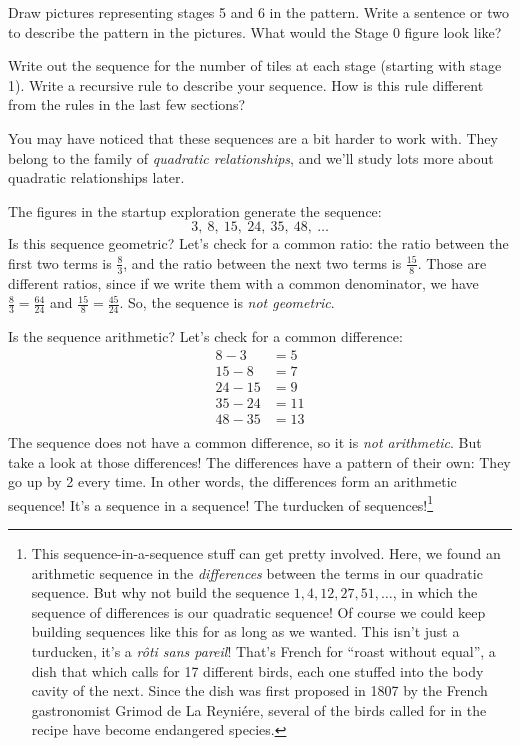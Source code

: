 \begin{boxedexplore}
Draw pictures representing stages 5 and 6 in the pattern. Write a sentence or two to describe the pattern in the pictures. What would the Stage 0 figure look like?

Write out the sequence for the number of tiles at each stage (starting with stage 1). Write a recursive rule to describe your sequence. How is this rule different from the rules in the last few sections?
\end{boxedexplore} %

You may have noticed that these sequences are a bit harder to work with. They belong to the family of \textit{quadratic relationships}, and we'll study lots more about quadratic relationships later.

The figures in the startup exploration generate the sequence: \[3,~ 8,~ 15,~ 24,~35,~48,~\dotsc\]
Is this sequence geometric? Let's check for a common ratio: the ratio between the first two terms is $\frac{8}{3}$, and the ratio between the next two terms is $\frac{15}{8}$. Those are different ratios, since if we write them with a common denominator, we have $\frac{8}{3}=\frac{64}{24}$ and $\frac{15}{8}=\frac{45}{24}$. So, the sequence is \textit{not geometric}.

Is the sequence arithmetic? Let's check for a common difference:
\[\begin{aligned}
8-3 &=5\\
15-8 &=7\\
24-15 &=9\\
35-24 &=11\\
48-35 &=13\\
\end{aligned}\]
The sequence does not have a common difference, so it is \textit{not arithmetic}. But take a look at those differences! The differences have a pattern of their own: They go up by 2 every time. In other words, the differences form an arithmetic sequence! It's a sequence in a sequence! The turducken of sequences!\footnote{This sequence-in-a-sequence stuff can get pretty involved. Here, we found an arithmetic sequence in the \textit{differences} between the terms in our quadratic sequence. But why not build the sequence $1, 4, 12, 27, 51,\dotsc$, in which the sequence of differences is our quadratic sequence! Of course we could keep building sequences like this for as long as we wanted. This isn't just a turducken, it's a \textit{r\^oti sans pareil}! That's French for ``roast without equal'', a dish that which calls for 17 different birds, each one stuffed into the body cavity of the next. Since the dish was first proposed in 1807 by the French gastronomist Grimod de La Reyni\'ere, several of the birds called for in the recipe have become endangered species.}

